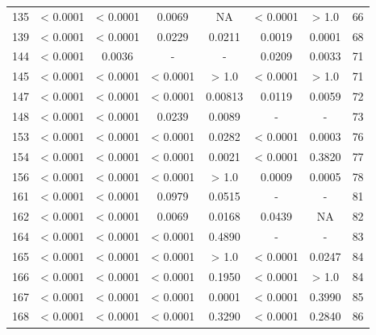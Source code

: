 {\begin{longtable}{cccccccc}
135 & {\color{red} < 0.0001} & {\color{red} < 0.0001} & {\color{red}0.0069} & NA & {\color{red} < 0.0001} & > 1.0 & 66 \\
139 & {\color{red} < 0.0001} & {\color{red} < 0.0001} & {\color{red}0.0229} & {\color{red}0.0211} & {\color{red}0.0019} & {\color{red}0.0001} & 68 \\
144 & {\color{red} < 0.0001} & {\color{red}0.0036} & - & - & {\color{red}0.0209} & {\color{red}0.0033} & 71 \\
145 & {\color{red} < 0.0001} & {\color{red} < 0.0001} & {\color{red} < 0.0001} & > 1.0 & {\color{red} < 0.0001} & > 1.0 & 71 \\
147 & {\color{red} < 0.0001} & {\color{red} < 0.0001} & {\color{red} < 0.0001} & {\color{red}0.00813} & {\color{red}0.0119} & {\color{red}0.0059} & 72 \\
148 & {\color{red} < 0.0001} & {\color{red} < 0.0001} & {\color{red}0.0239} & {\color{red}0.0089} & - & - & 73 \\
153 & {\color{red} < 0.0001} & {\color{red} < 0.0001} & {\color{red} < 0.0001} & {\color{red}0.0282} & {\color{red} < 0.0001} & {\color{red}0.0003} & 76 \\
154 & {\color{red} < 0.0001} & {\color{red} < 0.0001} & {\color{red} < 0.0001} & {\color{red}0.0021} & {\color{red} < 0.0001} & 0.3820 & 77 \\
156 & {\color{red} < 0.0001} & {\color{red} < 0.0001} & {\color{red} < 0.0001} & > 1.0 & {\color{red}0.0009} & {\color{red}0.0005} & 78 \\
161 & {\color{red} < 0.0001} & {\color{red} < 0.0001} & 0.0979 & 0.0515 & - & - & 81 \\
162 & {\color{red} < 0.0001} & {\color{red} < 0.0001} & {\color{red}0.0069} & {\color{red}0.0168} & {\color{red}0.0439} & NA & 82 \\
164 & {\color{red} < 0.0001} & {\color{red} < 0.0001} & {\color{red} < 0.0001} & 0.4890 & - & - & 83 \\
165 & {\color{red} < 0.0001} & {\color{red} < 0.0001} & {\color{red} < 0.0001} & > 1.0 & {\color{red} < 0.0001} & {\color{red}0.0247} & 84 \\
166 & {\color{red} < 0.0001} & {\color{red} < 0.0001} & {\color{red} < 0.0001} & 0.1950 & {\color{red} < 0.0001} & > 1.0 & 84 \\
167 & {\color{red} < 0.0001} & {\color{red} < 0.0001} & {\color{red} < 0.0001} & {\color{red}0.0001} & {\color{red} < 0.0001} & 0.3990 & 85 \\
168 & {\color{red} < 0.0001} & {\color{red} < 0.0001} & {\color{red} < 0.0001} & 0.3290 & {\color{red} < 0.0001} & 0.2840 & 86 \\

\end{longtable}}
